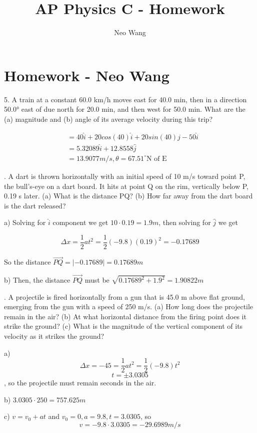 \documentclass{scrreprt} %
\title{AP Physics C - Homework}
\author{Neo Wang}
\begin{document}
\section{Homework - Neo Wang}

5. A train at a constant 60.0 km/h moves east for 40.0 min,
then  in  a  direction  50.0° east  of  due  north  for  20.0 min, and  then
west for 50.0 min. What are the (a) magnitude and (b) angle of its
average velocity during this trip?

\begin{align*}
	&= 40\hat{i} + 20cos(40)\hat{i} + 20sin(40)\hat{j} - 50 \hat{i} \\
	&= 5.32089\hat{i} + 12.8558\hat{j} \\
	&= \boxed{13.9077 m/s, \theta = 67.51^\circ \textrm{N of E}}
\end{align*}

. A dart is thrown horizontally with an initial speed of 
10 m/s  toward  point  P, the  bull’s-eye  on  a  dart  board. It  hits  at
point Q on the rim, vertically below P, 0.19 s later. (a) What is the
distance PQ?  (b)  How  far  away  from  the  dart  board  is  the  dart
released? \newline

a) Solving for $\hat{i}$ component we get $10\cdot 0.19 = 1.9 m$, then solving
for $\hat{j}$ we get

$$\Delta x = \frac{1}{2}at^2 = \frac{1}{2}(-9.8)(0.19)^2=-0.17689$$

So the distance $\vec{PQ} = |-0.17689| = \boxed{0.17689 m}$

b) Then, the distance $\vec{PQ}$ must be $\sqrt{0.17689^2 + 1.9^2} = \boxed{1.90822 m}$\newline

. A projectile is fired horizontally from a gun that is 
45.0 m above flat ground, emerging from the gun with a speed of
250 m/s. (a) How long does the projectile remain in the air? (b) At
what  horizontal  distance  from  the  firing  point  does  it  strike  the
ground? (c) What is the magnitude of the vertical component of its
velocity as it strikes the ground? \newline

a) $$\Delta x = -45 = \frac{1}{2}at^2 = \frac{1}{2}(-9.8)t^2$$
$$t = \pm 3.0305$$, so the projectile must remain  seconds in the air.

b) $3.0305\cdot 250 = \boxed{757.625 m}$

c) $v = v_0 + at$ and $v_0 = 0, a = 9.8, t = 3.0305$, so $$v = -9.8\cdot 3.0305 = \boxed{-29.6989 m/s}$$
\end{document}
